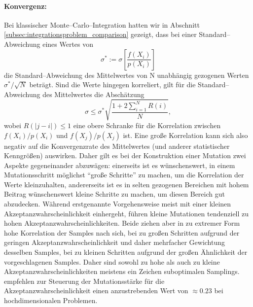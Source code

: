 	\paragraph{Konvergenz:}Bei klassischer Monte--Carlo--Integration hatten wir in Abschnitt \ref{subsec:integrationsproblem_comparison} gezeigt, dass bei einer Standard--Abweichung eines Wertes von $$\sigma^*:=\sigma\left[\frac{f(X_i)}{p(X_i)}\right]$$ die Standard--Abweichung des Mittelwertes von N unabhängig gezogenen Werten $\sigma^*/\sqrt{N}$ beträgt. Sind die Werte hingegen korreliert, gilt für die Standard--Abweichung des Mittelwertes die Abschätzung \citep[siehe][VII.\;\S3(8)]{Renyi:1964p10655}
	$$\sigma\leq \sigma^*\sqrt{\frac{1+2\sum_{i=1}^N R(i)}{N}},$$
	wobei $R(|j-i|)\leq 1$ eine obere Schranke für die Korrelation zwischen $f(X_i)/p(X_i)$ und $f(X_j)/p(X_j)$ ist.
	Eine große Korrelation kann sich also negativ auf die Konvergenzrate des Mittelwertes (und anderer statistischer Kenngrößen) auswirken. Daher gilt es bei der Konstruktion einer Mutation zwei Aspekte gegeneinander abzuwägen: einerseits ist es wünschenswert, in einem Mutationsschritt möglichst ``große Schritte'' zu machen, um die Korrelation der Werte kleinzuhalten, andererseits ist es in selten gezogenen Bereichen mit hohem Beitrag wünschenswert kleine Schritte zu machen, um diesen Bereich gut abzudecken. Während erstgenannte Vorgehensweise meist mit einer kleinen Akzeptanzwahrscheinlichkeit einhergeht, führen kleine Mutationen tendenziell zu hohen Akzeptanzwahrscheinlichkeiten. Beide ziehen aber in zu extremer Form hohe Korrelation der Samples nach sich, bei zu großen Schritten aufgrund der geringen Akzeptanzwahrscheinlichkeit und daher mehrfacher Gewichtung desselben Samples, bei zu kleinen Schritten aufgrund der großen Ähnlichkeit der vorgeschlagenen Samples. Daher sind sowohl zu hohe als auch zu kleine Akzeptanzwahrscheinlichkeiten meistens ein Zeichen suboptimalen Samplings. \citet{Roberts:1997p5198} empfehlen zur Steuerung der Mutationsstärke für die Akzeptanzwahrscheinlichkeit einen anzustrebenden Wert von $\approx 0.23$ bei hochdimensionalen Problemen.

	
	
